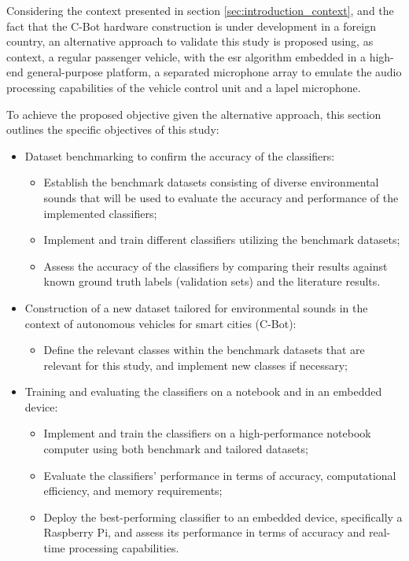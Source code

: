 Considering the context presented in section \ref{sec:introduction_context}, and the fact that the C-Bot hardware construction is under development in a foreign country, an alternative approach to validate this study is proposed using, as context, a regular passenger vehicle, with the \gls{esr} algorithm embedded in a high-end general-purpose platform, a separated microphone array to emulate the audio processing capabilities of the vehicle control unit and a lapel microphone.

To achieve the proposed objective given the alternative approach, this section outlines the specific objectives of this study:

\begin{itemize}
    \item Dataset benchmarking to confirm the accuracy of the classifiers:
    \begin{itemize}
        \item Establish the benchmark datasets consisting of diverse environmental sounds that will be used to evaluate the accuracy and performance of the implemented classifiers;
        \item Implement and train different classifiers utilizing the benchmark datasets;
        \item Assess the accuracy of the classifiers by comparing their results against known ground truth labels (validation sets) and the literature results.
    \end{itemize}
    \item Construction of a new dataset tailored for environmental sounds in the  context of autonomous vehicles for smart cities (C-Bot):
    \begin{itemize}
        \item Define the relevant classes within the benchmark datasets that are relevant for this study, and implement new classes if necessary;
    \end{itemize}
    \item Training and evaluating the classifiers on a notebook and in an embedded device:
    \begin{itemize}
        \item Implement and train the classifiers on a high-performance notebook computer using both benchmark and tailored datasets;
        \item Evaluate the classifiers' performance in terms of accuracy, computational efficiency, and memory requirements;
        \item Deploy the best-performing classifier to an embedded device, specifically a Raspberry Pi, and assess its performance in terms of accuracy and real-time processing capabilities.

\end{itemize}
\end{itemize}
